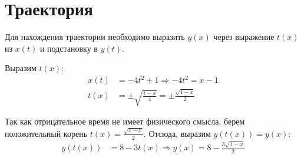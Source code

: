 \section{Траектория}
Для нахождения траектории необходимо выразить $y(x)$ через
выражение $t(x)$ из $x(t)$ и подстановку в $y(t)$.

Выразим $t(x)$:\\
\begin{align}
    x(t) &= -4t^{2} + 1 \Rightarrow -4t^{2} = x - 1 \\
    t(x) &= \pm\sqrt{\frac{1-x}{4}} = \pm\frac{\sqrt{1 - x}}{2}
\end{align}

Так как отрицательное время не имеет физического смысла, берем
положительный корень $t(x) = \frac{\sqrt{1 - x}}{2}$.
Отсюда, выразим $y(t(x)) = y(x)$:\\
\begin{align}
    y(t(x)) &= 8 - 3t(x) \Rightarrow
    y(x) = 8 - \frac{3\sqrt{1 - x}}{2}
\end{align}

\begin{figure}[ht]
    \centering
\end{figure}



